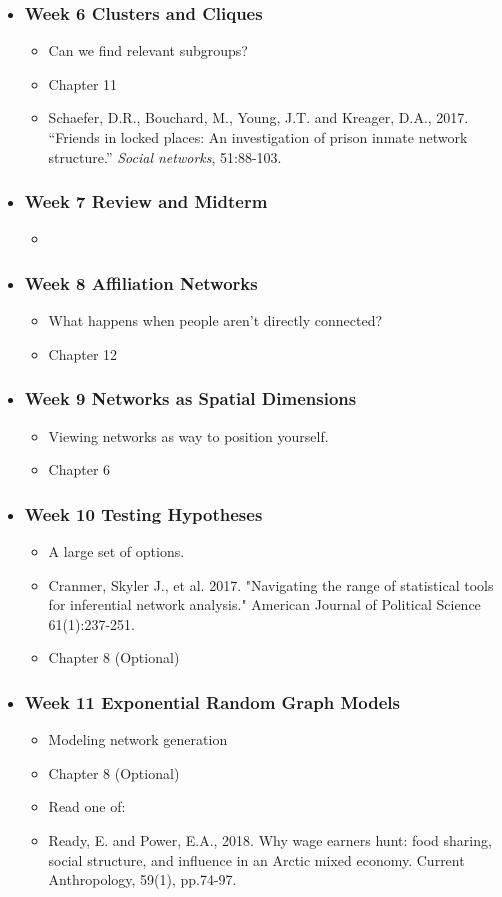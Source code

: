 \documentclass[11pt]{article}
\newenvironment{courseday}[2]{
\begin{itemize}
	\item[] \subsubsection*{\textbf{#1} #2}
	\begin{itemize}
}{
\end{itemize}
\end{itemize}
}
\begin{document}
\begin{courseday}{Week 6}{Clusters and Cliques}
	\item[] Can we find relevant subgroups?
	\item[] Chapter 11
	\item[] Schaefer, D.R., Bouchard, M., Young, J.T. and Kreager, D.A., 2017. ``Friends in locked places: An investigation of prison inmate network structure.'' \textit{Social networks}, 51:88-103.
	
	
\end{courseday}




\begin{courseday}{Week 7}{Review and Midterm}
	\item[] 
\end{courseday}



\begin{courseday}{Week 8}{Affiliation Networks}
	\item[] What happens when people aren't directly connected?
	\item[] Chapter 12
\end{courseday}



\begin{courseday}{Week 9}{Networks as Spatial Dimensions}
	\item[] Viewing networks as way to position yourself.
	\item[] Chapter 6 
\end{courseday}


\begin{courseday}{Week 10}{Testing Hypotheses}
	\item[] A large set of options. 
	\item[] Cranmer, Skyler J., et al. 2017. "Navigating the range of statistical tools for inferential network analysis." American Journal of Political Science 61(1):237-251.
	\item[] Chapter 8 (Optional)
\end{courseday}


\begin{courseday}{Week 11}{Exponential Random Graph Models}
	\item[] Modeling network generation
	\item[] Chapter 8 (Optional)
	\item[] Read one of:
	\item Ready, E. and Power, E.A., 2018. Why wage earners hunt: food sharing, social structure, and influence in an Arctic mixed economy. Current Anthropology, 59(1), pp.74-97.
\end{courseday}
\end{document}
